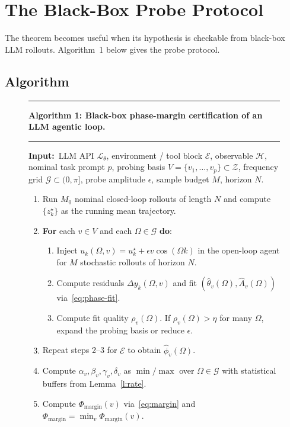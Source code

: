 \documentclass[11pt,a4paper]{article}
\theoremstyle{definition}
\theoremstyle{remark}
\newcommand{\embspace}{\mathcal{Z}}
\newcommand{\agent}{\mathcal{L}_{\theta}}
\newcommand{\env}{\mathcal{E}}
\newcommand{\obs}{\mathcal{H}}
\newcommand{\PhaseMargin}{\Phi_{\mathrm{margin}}}
\begin{document}
\section{The Black-Box Probe Protocol}\label{sec:protocol}

The theorem becomes useful when its hypothesis is checkable from black-box
LLM rollouts.  Algorithm~1 below gives the probe protocol.

\subsection{Algorithm}\label{ssec:algorithm}

\begin{figure}[t]
\centering
\hrule\vspace{4pt}
\noindent\textbf{Algorithm 1: Black-box phase-margin certification of an LLM agentic loop.}
\label{alg:probe}
\vspace{2pt}\hrule\vspace{6pt}
\small\noindent
\textbf{Input:}\, LLM API $\agent$, environment / tool block $\env$,
observable $\obs$, nominal task prompt $p$, probing basis
$V=\{v_{1},\dots,v_{p}\}\subset\embspace$, frequency grid
$\mathcal{G}\subset(0,\pi]$, probe amplitude $\epsilon$, sample budget
$M$, horizon $N$.

\medskip
\begin{enumerate}[label=\textbf{\arabic*.},leftmargin=*,itemsep=2pt,topsep=2pt]
\item Run $M_{0}$ nominal closed-loop rollouts of length $N$ and compute
$\{z_{k}^{\star}\}$ as the running mean trajectory.
\item \textbf{For} each $v\in V$ and each $\Omega\in\mathcal{G}$ \textbf{do}:
\begin{enumerate}[label=\,\textbf{\alph*.},leftmargin=2em,itemsep=2pt,topsep=2pt]
\item Inject $u_{k}(\Omega,v)=u_{k}^{\star}+\epsilon v\cos(\Omega k)$ in
the open-loop agent for $M$ stochastic rollouts of horizon $N$.
\item Compute residuals $\Delta y_{k}(\Omega,v)$ and fit
$(\widehat\theta_{v}(\Omega),\widehat A_{v}(\Omega))$
via~\eqref{eq:phase-fit}.
\item Compute fit quality $\rho_{v}(\Omega)$.  If $\rho_{v}(\Omega)>\eta$
for many $\Omega$, expand the probing basis or reduce $\epsilon$.
\end{enumerate}
\item Repeat steps 2--3 for $\env$ to obtain $\widehat\phi_{v}(\Omega)$.
\item Compute $\alpha_{v},\beta_{v},\gamma_{v},\delta_{v}$ as
$\min/\max$ over $\Omega\in\mathcal{G}$ with statistical buffers from
Lemma~\ref{l:rate}.
\item Compute $\PhaseMargin(v)$ via~\eqref{eq:margin} and
$\PhaseMargin=\min_{v}\PhaseMargin(v)$.
\end{enumerate}


\end{figure}
\end{document}
